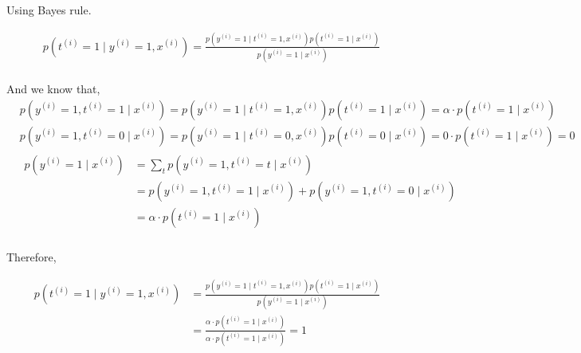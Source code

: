 \begin{answer}
Using Bayes rule.

\begin{align*}
    & p(t^{(i)}=1\mid y^{(i)} = 1, x^{(i)}) = \frac{p(y^{(i)} = 1\mid t^{(i)}=1, x^{(i)})p(t^{(i)}=1\mid x^{(i)})}{p(y^{(i)}=1\mid x^{(i)})} \\
\end{align*}

And we know that,
\begin{align*}
    & p(y^{(i)}=1, t^{(i)}=1\mid x^{(i)}) = p(y^{(i)}=1\mid t^{(i)}=1, x^{(i)}) p(t^{(i)}=1\mid x^{(i)}) = \alpha \cdot p(t^{(i)}=1\mid x^{(i)})\\
    & p(y^{(i)}=1, t^{(i)}=0\mid x^{(i)}) = p(y^{(i)}=1\mid t^{(i)}=0, x^{(i)}) p(t^{(i)}=0\mid x^{(i)}) = 0 \cdot p(t^{(i)}=1\mid x^{(i)}) = 0\\
    &\begin{aligned}
    p(y^{(i)}=1\mid x^{(i)}) &= \sum_t p(y^{(i)}=1, t^{(i)}=t\mid x^{(i)}) \\
    &= p(y^{(i)}=1, t^{(i)}=1\mid x^{(i)}) + p(y^{(i)}=1, t^{(i)}=0\mid x^{(i)}) \\
    &= \alpha \cdot p(t^{(i)}=1\mid x^{(i)})\\
    \end{aligned}
\end{align*}

Therefore,

\begin{align*}
    p(t^{(i)}=1\mid y^{(i)} = 1, x^{(i)}) &= \frac{p(y^{(i)} = 1\mid t^{(i)}=1, x^{(i)})p(t^{(i)}=1\mid x^{(i)})}{p(y^{(i)}=1\mid x^{(i)})} \\
    &= \frac{\alpha \cdot p(t^{(i)}=1\mid x^{(i)})}{\alpha \cdot p(t^{(i)}=1\mid x^{(i)})} = 1\\
\end{align*}
\end{answer}
